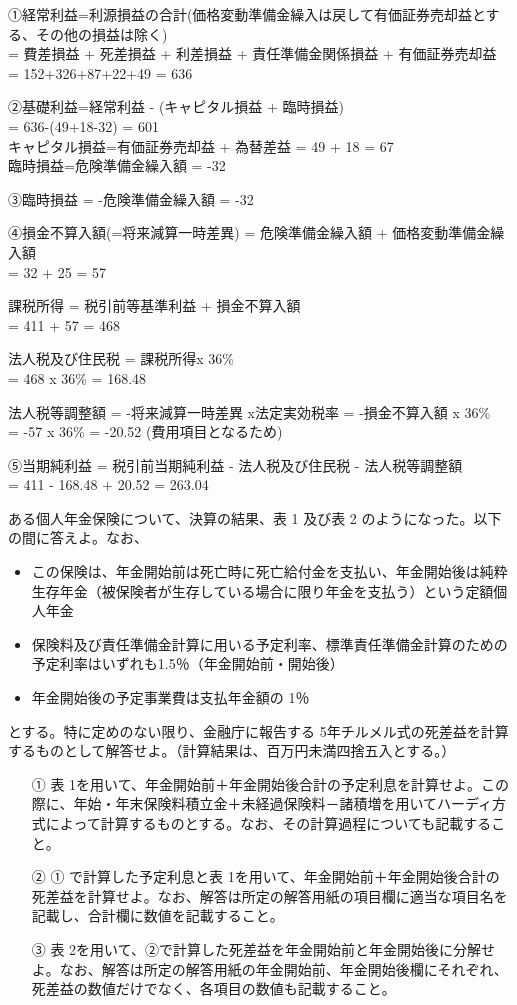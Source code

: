 \documentclass[report,gutter=10mm,fore-edge=10mm,uplatex,dvipdfmx]{jlreq}
\begin{document}

①経常利益=利源損益の合計(価格変動準備金繰入は戻して有価証券売却益とする、その他の損益は除く)\\
= 費差損益 + 死差損益 + 利差損益 + 責任準備金関係損益 + 有価証券売却益\\
= 152+326+87+22+49 = 636 

②基礎利益=経常利益 - (キャピタル損益 + 臨時損益) \\
= 636-(49+18-32) = 601\\
キャピタル損益=有価証券売却益 + 為替差益 = 49 + 18 = 67\\
臨時損益=危険準備金繰入額 = -32

③臨時損益 = -危険準備金繰入額
= -32

④損金不算入額(=将来減算一時差異) = 危険準備金繰入額 + 価格変動準備金繰入額\\
= 32 + 25 = 57

課税所得 = 税引前等基準利益 + 損金不算入額 \\
= 411 + 57 = 468

法人税及び住民税 = 課税所得x 36\% \\
= 468 x 36\% = 168.48

法人税等調整額 = -将来減算一時差異 x法定実効税率 = -損金不算入額 x 36\% \\
= -57 x 36\% = -20.52 (費用項目となるため)

⑤当期純利益 = 税引前当期純利益 - 法人税及び住民税 - 法人税等調整額 \\
= 411 - 168.48 + 20.52 = 263.04



ある個人年金保険について、決算の結果、表 1 及び表 2
のようになった。以下の間に答えよ。なお、
\begin{itemize}
\item この保険は、年金開始前は死亡時に死亡給付金を支払い、年金開始後は純粋生存年金（被保険者が生存している場合に限り年金を支払う）という定額個人年金
\item 保険料及び責任準備金計算に用いる予定利率、標準責任準備金計算のための予定利率はいずれも1.5％（年金開始前・開始後） 
 \item 
年金開始後の予定事業費は支払年金額の 1％ 
\end{itemize}
とする。特に定めのない限り、金融庁に報告する 5年チルメル式の死差益を計算するものとして解答せよ。（計算結果は、百万円未満四捨五入とする。） 

\begin{enumerate}
\item [①] 表 1を用いて、年金開始前＋年金開始後合計の予定利息を計算せよ。この際に、年始・年末保険料積立金＋未経過保険料－諸積増を用いてハーディ方式によって計算するものとする。なお、その計算過程についても記載すること。
\item [②]① で計算した予定利息と表 1を用いて、年金開始前＋年金開始後合計の死差益を計算せよ。なお、解答は所定の解答用紙の項目欄に適当な項目名を記載し、合計欄に数値を記載すること。
\item [③] 表 2を用いて、②で計算した死差益を年金開始前と年金開始後に分解せよ。なお、解答は所定の解答用紙の年金開始前、年金開始後欄にそれぞれ、死差益の数値だけでなく、各項目の数値も記載すること。
\end{enumerate}
\end{document}
